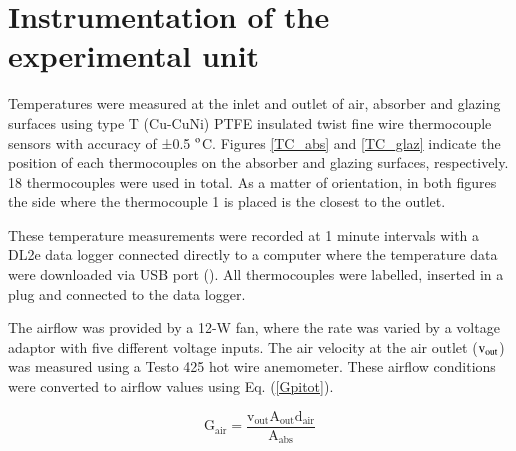 
\section{Instrumentation of the experimental unit}

Temperatures were measured at the inlet and outlet of air, absorber and glazing surfaces using type T (Cu-CuNi) PTFE insulated twist fine wire thermocouple sensors with accuracy of ±0.5 $^{\rm{o}}$C. Figures \ref{TC_abs} and \ref{TC_glaz} indicate the position of each thermocouples on the absorber and glazing surfaces, respectively. 18 thermocouples were used in total. As a matter of orientation, in both figures the side where the thermocouple 1 is placed is the closest to the outlet.



These temperature measurements were recorded at 1 minute intervals with a DL2e data logger connected directly to a computer where the temperature data were downloaded via USB port (\cite{Devices2018}). All thermocouples were labelled, inserted in a plug and connected to the data logger.

The airflow was provided by a 12-W fan, where the rate was varied by a voltage adaptor with five different voltage inputs. The air velocity at the air outlet ($\rm{v_{out}}$) was measured using a Testo 425 hot wire anemometer. These airflow conditions were converted to airflow values using Eq. (\ref{Gpitot}).


\vspace{-0.75cm}
\begin{equation}
\mathrm{{G_{air}} = \frac{{{v_{out}}{A_{out}}{d_{air}}}}{{{A_{abs}}}}}
\label{Gpitot}
\end{equation}

